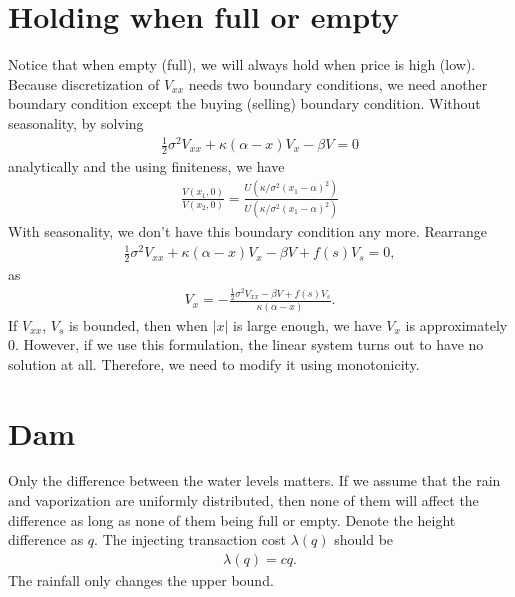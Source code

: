 \documentclass[paper=a4, fontsize=15pt]{scrartcl} %
\numberwithin{equation}{section} %
\numberwithin{figure}{section} %
\numberwithin{table}{section} %
\begin{document}
\section{Holding when full or empty}
Notice that when empty (full), we will always hold when price is high (low). Because discretization of $V_{xx}$ needs two boundary conditions, we need another boundary condition except the buying (selling) boundary condition. Without seasonality, by solving
\begin{equation*}
\begin{split}
  \frac{1}{2} \sigma^2 V_{xx} + \kappa(\alpha - x) V_x - \beta V = 0
\end{split}
\end{equation*}
analytically and the using finiteness, we have 
\begin{equation*}
\begin{split}
  \frac{V(x_1,0)}{V(x_2,0)} = \frac{U\left(\kappa/\sigma^2(x_1-\alpha)^2\right)}{U\left(\kappa/\sigma^2(x_1-\alpha)^2\right)}
\end{split}
\end{equation*}
With seasonality, we don't have this boundary condition any more. Rearrange
\begin{equation*}
\begin{split}
  \frac{1}{2} \sigma^2 V_{xx} + \kappa(\alpha - x) V_x - \beta V +f(s) V_s = 0,
\end{split}
\end{equation*}
as
\begin{equation*}
\begin{split}
  V_x = -\frac{\frac{1}{2} \sigma^2 V_{xx} - \beta V +f(s) V_s}{\kappa(\alpha - x)}.
\end{split}
\end{equation*}
If $V_{xx}$, $V_s$ is bounded, then when $|x|$ is large enough, we have $V_x$ is approximately 0. However, if we use this formulation, the linear system turns out to have no solution at all. Therefore, we need to modify it using monotonicity.

\section{Dam}
Only the difference between the water levels matters. If we assume that the rain and vaporization are uniformly distributed, then none of them will affect the difference as long as none of them being full or empty. Denote the height difference as $q$. The injecting transaction cost $\lambda(q)$ should be 
\begin{equation*}
\begin{split}
  \lambda(q) = cq.
\end{split}
\end{equation*}
The rainfall only changes the upper bound.\\
\end{document}
